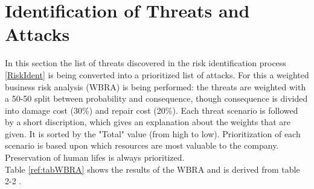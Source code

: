 \section{Identification of Threats and Attacks}\label{sec:IdentThreatsAttacks}
In this section the list of threats discovered in the risk identification process \ref{RiskIdent} is being converted into a prioritized list of attacks. For this a weighted business risk analysis (WBRA) is being performed: the threats are weighted with a 50-50 split between probability and consequence, though consequence is divided into damage cost (30\%) and repair cost (20\%). Each threat scenario is followed by a short discription, which gives an explanation about the weights that are given. It is sorted by the "Total" value (from high to low). Prioritization of each scenario is based upon which resources are most valuable to the company. Preservation of human lifes is always prioritized.\\
Table \ref{ref:tabWBRA} shows the results of the WBRA and is derived from table 2-2 \cite{whitman2}.\\
